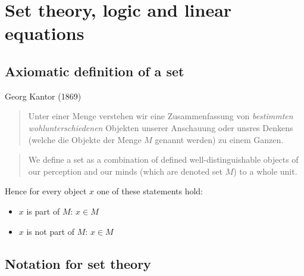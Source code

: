 \documentclass[a4paper,landscape,twocolumn]{article}
\begin{document}
\section{Set theory, logic and linear equations}
\subsection{Axiomatic definition of a set}

Georg Kantor (1869)
\begin{quote}
  Unter einer Menge verstehen wir eine Zusammenfassung von \emph{bestimmten}
  \emph{wohlunterschiedenen} Objekten unserer Anschauung oder unsres Denkens
  (welche die Objekte der Menge $M$ genannt werden) zu einem Ganzen.
\end{quote}
\begin{quote}
  We define a set as a combination of defined well-distinguishable objects of
  our perception and our minds (which are denoted set $M$) to a whole unit.
\end{quote}

Hence for every object $x$ one of these statements hold:
\begin{itemize}
    \item $x$ is part of $M$: $x \in M$
    \item $x$ is not part of $M$: $x \in M$
\end{itemize}

\subsection{Notation for set theory}
\end{document}
